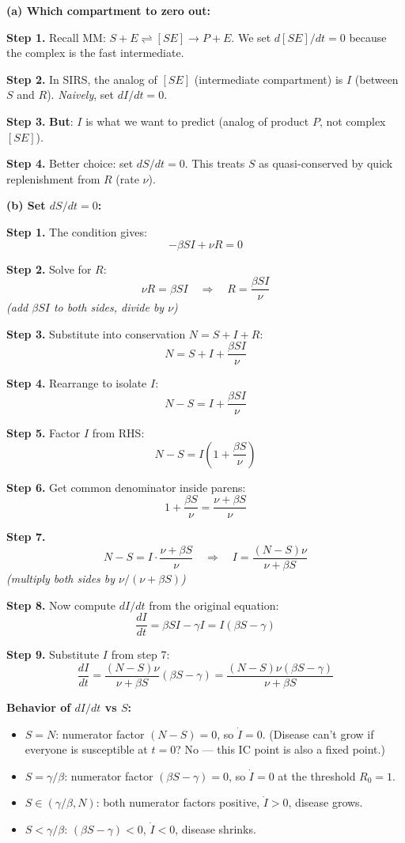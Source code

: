 \documentclass[10pt]{article}
\newcommand{\thus}{\quad\Longrightarrow\quad}
\newcommand{\stepwhy}[1]{\textcolor{blue!60!black}{\small\textit{(#1)}}}
\begin{document}
\begin{solution}
\textbf{(a) Which compartment to zero out:}

\textbf{Step 1.} Recall MM: $S + E \rightleftharpoons [SE] \to P + E$. We set $d[SE]/dt = 0$ because the complex is the fast intermediate.

\textbf{Step 2.} In SIRS, the analog of $[SE]$ (intermediate compartment) is $I$ (between $S$ and $R$). \emph{Naively}, set $dI/dt = 0$.

\textbf{Step 3.} \textbf{But}: $I$ is what we want to predict (analog of product $P$, not complex $[SE]$).

\textbf{Step 4.} Better choice: set $dS/dt = 0$. This treats $S$ as quasi-conserved by quick replenishment from $R$ (rate $\nu$).

\medskip\textbf{(b) Set $dS/dt = 0$:}

\textbf{Step 1.} The condition gives:
\[
-\beta SI + \nu R = 0
\]

\textbf{Step 2.} Solve for $R$:
\[
\nu R = \beta SI \thus R = \frac{\beta SI}{\nu}
\]
\stepwhy{add $\beta SI$ to both sides, divide by $\nu$}

\textbf{Step 3.} Substitute into conservation $N = S + I + R$:
\[
N = S + I + \frac{\beta SI}{\nu}
\]

\textbf{Step 4.} Rearrange to isolate $I$:
\[
N - S = I + \frac{\beta SI}{\nu}
\]

\textbf{Step 5.} Factor $I$ from RHS:
\[
N - S = I\left(1 + \frac{\beta S}{\nu}\right)
\]

\textbf{Step 6.} Get common denominator inside parens:
\[
1 + \frac{\beta S}{\nu} = \frac{\nu + \beta S}{\nu}
\]

\textbf{Step 7.}
\[
N - S = I\cdot\frac{\nu + \beta S}{\nu} \thus I = \frac{(N-S)\nu}{\nu + \beta S}
\]
\stepwhy{multiply both sides by $\nu/(\nu+\beta S)$}

\textbf{Step 8.} Now compute $dI/dt$ from the original equation:
\[
\frac{dI}{dt} = \beta SI - \gamma I = I(\beta S - \gamma)
\]

\textbf{Step 9.} Substitute $I$ from step 7:
\[
\frac{dI}{dt} = \frac{(N-S)\nu}{\nu + \beta S}(\beta S - \gamma) = \frac{(N-S)\nu(\beta S - \gamma)}{\nu + \beta S}
\]

\medskip\textbf{Behavior of $dI/dt$ vs $S$:}
\begin{itemize}
\item $S = N$: numerator factor $(N-S) = 0$, so $\dot I = 0$. (Disease can't grow if everyone is susceptible at $t=0$? No --- this IC point is also a fixed point.)
\item $S = \gamma/\beta$: numerator factor $(\beta S - \gamma) = 0$, so $\dot I = 0$ at the threshold $R_0 = 1$.
\item $S \in (\gamma/\beta, N)$: both numerator factors positive, $\dot I > 0$, disease grows.
\item $S < \gamma/\beta$: $(\beta S - \gamma) < 0$, $\dot I < 0$, disease shrinks.
\end{itemize}


\end{solution}
\end{document}
